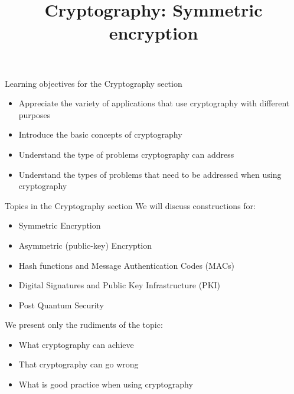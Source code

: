 \documentclass[aspectratio=169, lualatex, handout, 10pt,dvipsnames,svgnames]{beamer} %
\begin{document}
\begin{frame}{Learning objectives for the Cryptography section}

  \begin{itemize}
  \item Appreciate the variety of applications that use cryptography with different purposes
    \bigskip{}
    
  \item Introduce the basic concepts of cryptography
    \bigskip{}
    
    
  \item Understand the type of problems cryptography can address
    \bigskip{}
    
  \item Understand the types of problems that need to be addressed when using cryptography
    
  \end{itemize}

\end{frame}

\begin{frame}{Topics in the Cryptography section}
  We will discuss constructions for:
  \begin{itemize}
  \item Symmetric Encryption
  \item Asymmetric (public-key) Encryption
  \item Hash functions and Message Authentication Codes (MACs)
  \item Digital Signatures and Public Key Infrastructure (PKI)
  \item Post Quantum Security
  \end{itemize}
  \bigskip
  
  \begin{block}{We present only the rudiments of the topic:}
    \begin{itemize}
    \item What cryptography can achieve
    \item That cryptography can go wrong
    \item What is good practice when using cryptography
    \end{itemize}
  \end{block}
  
\end{frame}

\title{Cryptography: Symmetric encryption}
\author{}
\date{}
\end{document}
